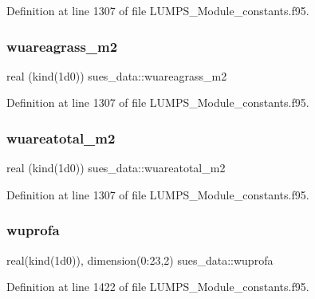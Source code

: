 Definition at line 1307 of file L\+U\+M\+P\+S\+\_\+\+Module\+\_\+constants.\+f95.

\mbox{\label{namespacesues__data_a9d58cea1a78af7ae81ee097bde9e0ef4}} 
\subsubsection{\texorpdfstring{wuareagrass\+\_\+m2}{wuareagrass\_m2}}
{\footnotesize\ttfamily real (kind(1d0)) sues\+\_\+data\+::wuareagrass\+\_\+m2}



Definition at line 1307 of file L\+U\+M\+P\+S\+\_\+\+Module\+\_\+constants.\+f95.

\mbox{\label{namespacesues__data_a4145456981d7aaa8f5b19ab3ea5f1781}} 
\subsubsection{\texorpdfstring{wuareatotal\+\_\+m2}{wuareatotal\_m2}}
{\footnotesize\ttfamily real (kind(1d0)) sues\+\_\+data\+::wuareatotal\+\_\+m2}



Definition at line 1307 of file L\+U\+M\+P\+S\+\_\+\+Module\+\_\+constants.\+f95.

\mbox{\label{namespacesues__data_a8b58e7f44021d419ca3e9da1c2a8db49}} 
\subsubsection{\texorpdfstring{wuprofa}{wuprofa}}
{\footnotesize\ttfamily real(kind(1d0)), dimension(0\+:23,2) sues\+\_\+data\+::wuprofa}



Definition at line 1422 of file L\+U\+M\+P\+S\+\_\+\+Module\+\_\+constants.\+f95.

\mbox{\label{namespacesues__data_a5926d0d936d383d4f839d9e7bcc65f48}} 
